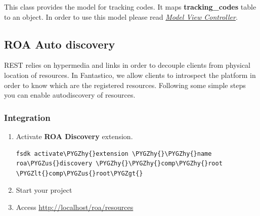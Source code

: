 \documentclass[letterpaper,10pt,english]{sphinxmanual}
\def\PYGZus{\char`\_}
\def\PYGZlt{\char`\<}
\def\PYGZgt{\char`\>}
\def\PYGZhy{\char`\-}
\begin{document}

\begin{fulllineitems}
\label{features/components/tracking_codes/tracking_codes:fantastico.contrib.tracking_codes.models.codes.TrackingCode}
This class provides the model for tracking codes. It maps \textbf{tracking\_codes} table to an object. In order to use this model
please read {\hyperref[features/mvc::doc]{\emph{Model View Controller}}}.

\end{fulllineitems}



\subsection{ROA Auto discovery}
\label{features/components/roa_discovery/roa_discovery::doc}\label{features/components/roa_discovery/roa_discovery:roa-auto-discovery}
REST relies on hypermedia and links in order to decouple clients from physical location of resources. In Fantastico,
we allow clients to introspect the platform in order to know which are the registered resources. Following some simple steps
you can enable autodiscovery of resources.


\subsubsection{Integration}
\label{features/components/roa_discovery/roa_discovery:integration}\begin{enumerate}
\item {} 
Activate \textbf{ROA Discovery} extension.

\begin{Verbatim}[commandchars=\\\{\}]
fsdk activate\PYGZhy{}extension \PYGZhy{}\PYGZhy{}name roa\PYGZus{}discovery \PYGZhy{}\PYGZhy{}comp\PYGZhy{}root \PYGZlt{}comp\PYGZus{}root\PYGZgt{}
\end{Verbatim}

\item {} 
Start your project

\item {} 
Access \href{http://localhost/roa/resources}{http://localhost/roa/resources}

\end{enumerate}
\end{document}
